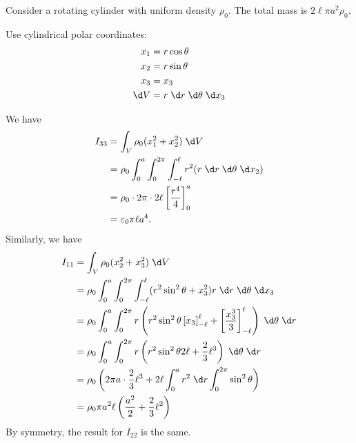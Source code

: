 \documentclass[a4paper]{article}
\begin{document}
\begin{eg}
  Consider a rotating cylinder with uniform density $\rho_0$. The total mass is $2\ell \pi a^2 \rho_0$.
  \begin{center}
  \end{center}
  Use cylindrical polar coordinates:
  \begin{align*}
    x_1 &= r\cos \theta\\
    x_2 &= r\sin \theta\\
    x_3 &= x_3\\
    \d V &= r\;\d r\;\d \theta \;\d x_3
  \end{align*}

  We have
  \begin{align*}
    I_{33} &= \int_V \rho_0 (x_1^2 + x_2^2)\;\d V\\
    &= \rho_0 \int_0^a \int_0^{2\pi} \int_{-\ell}^\ell r^2 (r\;\d r\;\d \theta \;\d x_2)\\
    &= \rho_0 \cdot 2\pi \cdot 2\ell \left[\frac{r^4}{4}\right]_0^a\\
    &= \varepsilon_0 \pi \ell a^4.
  \end{align*}
  Similarly, we have
  \begin{align*}
    I_{11} &= \int_V \rho_0 (x_2^2 + x_3^2)\;\d V\\
    &= \rho_0 \int_0^a \int_0^{2\pi}\int_{-\ell}^\ell (r^2 \sin^2 \theta + x_3^2) r\;\d r\;\d \theta \;\d x_3\\
    &= \rho_0 \int_0^a \int_0^{2\pi} r\left(r^2 \sin^2 \theta\left[x_3\right]_{-\ell}^\ell + \left[\frac{x_3^3}{3}\right]^{\ell}_{-\ell}\right)\;\d \theta\;\d r\\
    &= \rho_0 \int_0^a \int_0^{2\pi} r\left(r^2 \sin^2 \theta 2\ell + \frac{2}{3}\ell^3\right)\;\d \theta\;\d r\\
    &= \rho_0 \left(2\pi a \cdot \frac{2}{3}\ell^3 + 2\ell\int_0^a r^2 \;\d r\int_0^{2\pi}\sin^2 \theta\right)\\
    &= \rho_0 \pi a^2 \ell\left(\frac{a^2}{2} + \frac{2}{3}\ell^2\right)
  \end{align*}
  By symmetry, the result for $I_{22}$ is the same.


\end{eg}
\end{document}
